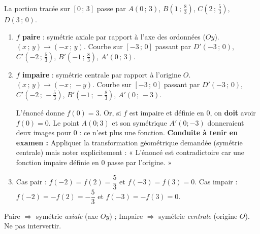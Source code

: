\documentclass[11pt]{article}
\begin{document}
\begin{corrige}
La portion tracée sur $[0\,;\,3]$ passe par $A(0\,;\,3)$, $B(1\,;\,\tfrac{8}{3})$, $C(2\,;\,\tfrac{5}{3})$, $D(3\,;\,0)$.
\begin{enumerate}
    \item \textbf{$f$ paire} : symétrie axiale par rapport à l'axe des ordonnées ($Oy$). $(x\,;\,y)\to(-x\,;\,y)$.
    Courbe sur $[-3\,;\,0]$ passant par $D'(-3\,;\,0)$, $C'(-2\,;\,\tfrac53)$, $B'(-1\,;\,\tfrac83)$, $A'(0\,;\,3)$.
    \item \textbf{$f$ impaire} : symétrie centrale par rapport à l'origine $O$. $(x\,;\,y)\to(-x\,;\,-y)$.
    Courbe sur $[-3\,;\,0]$ passant par $D'(-3\,;\,0)$, $C'(-2\,;\,-\tfrac53)$, $B'(-1\,;\,-\tfrac83)$, $A'(0\,;\,-3)$.
    \begin{attention}
    L'énoncé donne $f(0)=3$. Or, si $f$ est impaire et définie en $0$, on \textbf{doit} avoir $f(0)=0$. Le point $A(0;3)$ et son symétrique $A'(0;-3)$ donneraient deux images pour $0$ : ce n'est plus une fonction.
    \textbf{Conduite à tenir en examen :} Appliquer la transformation géométrique demandée (symétrie centrale) mais noter explicitement : « L'énoncé est contradictoire car une fonction impaire définie en $0$ passe par l'origine. »
    \end{attention}
    \item Cas pair : $f(-2)=f(2)=\dfrac{5}{3}$ et $f(-3)=f(3)=0$.
    Cas impair : $f(-2)=-f(2)=-\dfrac{5}{3}$ et $f(-3)=-f(3)=0$.
\end{enumerate}
\begin{attention}[Rappel]
Paire $\Rightarrow$ symétrie \emph{axiale} (axe $Oy$) ; Impaire $\Rightarrow$ symétrie \emph{centrale} (origine $O$). Ne pas intervertir.
\end{attention}
\end{corrige}
\end{document}
